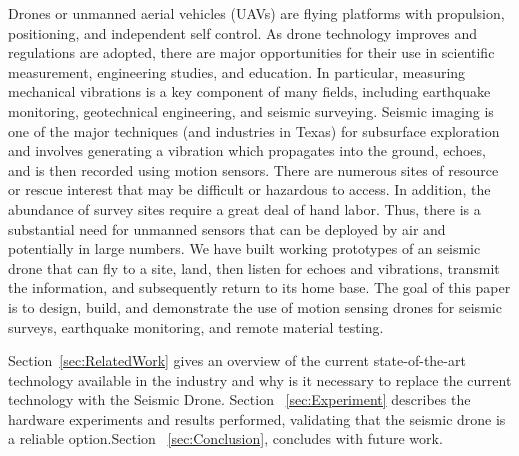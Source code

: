 Drones or unmanned aerial vehicles (UAVs) are flying
platforms with propulsion, positioning, and independent self control.
As drone technology improves and regulations are
adopted, there are major opportunities for their use in scientific
measurement, engineering studies, and education. In particular,
measuring mechanical vibrations is a key component of many
fields, including earthquake monitoring, geotechnical engineering,
and seismic surveying. Seismic imaging is one of the
major techniques (and industries in Texas) for subsurface exploration
and involves generating a vibration which propagates
into the ground, echoes, and is then recorded using motion
sensors. There are numerous sites of resource or rescue interest
that may be difficult or hazardous to access. In addition, the abundance of survey sites require a great deal
of hand labor. Thus, there is a substantial need for unmanned
sensors that can be deployed by air and potentially in large
numbers. We have built working prototypes of an seismic drone that can fly to a site, land, then
listen for echoes and vibrations, transmit the information, and
subsequently return to its home base.
The goal of this paper is to design, build, and demonstrate
the use of motion sensing drones for seismic surveys, earthquake monitoring, and remote material testing. 

Section~\ref{sec:RelatedWork}  gives an overview of  the current state-of-the-art technology available in the industry and why is it necessary to replace the current technology  with the Seismic Drone.
Section ~\ref{sec:Experiment} describes the hardware experiments and results performed, validating that the seismic drone is a reliable option.Section ~\ref{sec:Conclusion}, concludes with future work.

